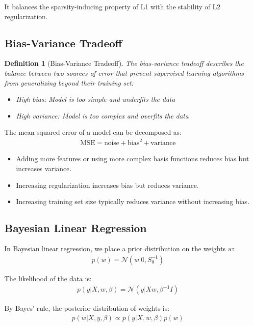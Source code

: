 \documentclass{article}
\newtheorem{definition}{Definition}
\begin{document}
It balances the sparsity-inducing property of L1 with the stability of L2 regularization.

\subsection{Bias-Variance Tradeoff}
\begin{definition}[Bias-Variance Tradeoff]
The bias-variance tradeoff describes the balance between two sources of error that prevent supervised learning algorithms from generalizing beyond their training set:
\begin{itemize}
\item High bias: Model is too simple and underfits the data
\item High variance: Model is too complex and overfits the data
\end{itemize}
\end{definition}

The mean squared error of a model can be decomposed as:
\begin{align}
\text{MSE} = \text{noise} + \text{bias}^2 + \text{variance}
\end{align}

\begin{itemize}
\item Adding more features or using more complex basis functions reduces bias but increases variance.
\item Increasing regularization increases bias but reduces variance.
\item Increasing training set size typically reduces variance without increasing bias.
\end{itemize}

\subsection{Bayesian Linear Regression}
In Bayesian linear regression, we place a prior distribution on the weights $w$:
\begin{align}
p(w) = \mathcal{N}(w|0, S_0^{-1})
\end{align}

The likelihood of the data is:
\begin{align}
p(y|X, w, \beta) = \mathcal{N}(y|Xw, \beta^{-1}I)
\end{align}

By Bayes' rule, the posterior distribution of weights is:
\begin{align}
p(w|X, y, \beta) \propto p(y|X, w, \beta)p(w)
\end{align}
\end{document}
